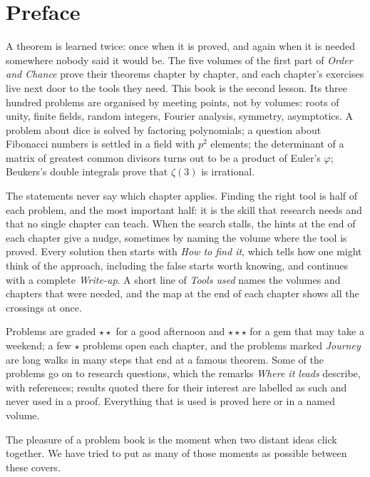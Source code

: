\chapter*{Preface}
A theorem is learned twice: once when it is proved, and again when it is needed somewhere nobody said it would be. The
five volumes of the first part of \emph{Order and Chance} prove their theorems chapter by chapter, and each chapter's
exercises live next door to the tools they need. This book is the second lesson. Its three hundred problems are
organised by meeting points, not by volumes: roots of unity, finite fields, random integers, Fourier analysis, symmetry,
asymptotics. A problem about dice is solved by factoring polynomials; a question about Fibonacci numbers is settled in a
field with $p^2$ elements; the determinant of a matrix of greatest common divisors turns out to be a product of Euler's
$\varphi$; Beukers's double integrals prove that $\zeta(3)$ is irrational.

The statements never say which chapter applies. Finding the right tool is half of each problem, and the most important
half: it is the skill that research needs and that no single chapter can teach. When the search stalls, the hints at the
end of each chapter give a nudge, sometimes by naming the volume where the tool is proved. Every solution then starts with
\emph{How to find it}, which tells how one might think of the approach, including the false starts worth knowing, and
continues with a complete \emph{Write-up}. A short line of \emph{Tools used} names the volumes and chapters that were
needed, and the map at the end of each chapter shows all the crossings at once.

Problems are graded \textbf{$\star\star$} for a good afternoon and \textbf{$\star\star\star$} for a gem that may take a
weekend; a few \textbf{$\star$} problems open each chapter, and the problems marked \emph{Journey} are long walks in many
steps that end at a famous theorem. Some of the problems go on to research questions, which the remarks \emph{Where it
leads} describe, with references; results quoted there for their interest are labelled as such and never used in a proof.
Everything that is used is proved here or in a named volume.


The pleasure of a problem book is the moment when two distant ideas click together. We have tried to put as many of those
moments as possible between these covers.
